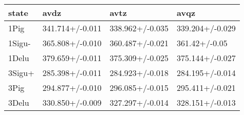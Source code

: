 \begin{tabular}{llll}
\toprule
state & avdz & avtz & avqz \\
\midrule
1Pig & 341.714+/-0.011 & 338.962+/-0.035 & 339.204+/-0.029 \\
1Sigu- & 365.808+/-0.010 & 360.487+/-0.021 & 361.42+/-0.05 \\
1Delu & 379.659+/-0.011 & 375.309+/-0.025 & 375.144+/-0.027 \\
3Sigu+ & 285.398+/-0.011 & 284.923+/-0.018 & 284.195+/-0.014 \\
3Pig & 294.877+/-0.010 & 296.085+/-0.015 & 295.411+/-0.021 \\
3Delu & 330.850+/-0.009 & 327.297+/-0.014 & 328.151+/-0.013 \\
\bottomrule
\end{tabular}
